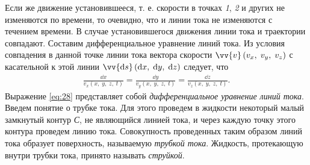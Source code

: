 	Если же движение установившееся, т. е. скорости в точках \textit{1}, \textit{2} и других не изменяются по времени, то очевидно, что и линии тока не изменяются с течением времени. В случае установившегося движения линии тока и траектории совпадают.\n
	Составим дифференциальное уравнение линий тока. Из условия совпадения в данной точке линии тока вектора скорости $\vv{v}\left(v_x,\; v_y,\; v_z\right)$ с касательной к этой линии $\vv{\dd s}\left(\dd x,\; \dd y,\; \dd z\right)$ следует, что
	\begin{gather}
		\frac{\dd x}{v_x(x,\; y,\; z,\; t)} = \frac{\dd y}{v_y(x,\; y,\; z,\; t)} = \frac{\dd z}{v_z(x,\; y,\; z,\; t)}.\label{eq:28}
	\end{gather}\n
	Выражение \eqref{eq:28} представляет собой \textit{дифференциальное уравнение линий тока}.\n
	Введем понятие о трубке тока. Для этого проведем в жидкости некоторый малый замкнутый контур \textit{С}, не являющийся линией тока, и через каждую точку этого контура проведем линию тока. Совокупность проведенных таким образом линий тока образует поверхность, называемую \textit{трубкой тока}. Жидкость, протекающую внутри трубки тока, принято называть \textit{струйкой}.
	
